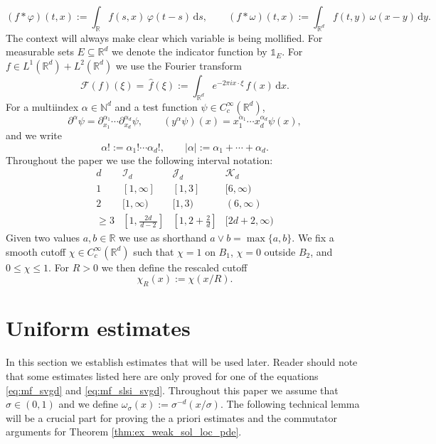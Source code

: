 \documentclass[reqno, 11pt]{amsart}
\numberwithin{equation}{section}
\theoremstyle{definition}
\begin{document}
\[
(f\ast\varphi)(t,x):=\int_{\mathbb{R}} f(s,x)\,\varphi(t-s)\,\mathrm{d} s,
\qquad
(f\ast\omega)(t,x):=\int_{\mathbb{R}^d} f(t,y)\,\omega(x-y)\,\mathrm{d} y.
\]
The context will always make clear which variable is being mollified.
For measurable sets $E\subseteq\mathbb{R}^d$ we denote the indicator function by $\mathds{1}_E$. For $f\in L^1(\mathbb{R}^d)+L^2(\mathbb{R}^d)$ we use the Fourier transform
\[
\mathcal{F}(f)(\xi)=\,\widehat f(\xi):=\int_{\mathbb{R}^d} e^{-2\pi i x\cdot\xi}\,f(x)\,\mathrm{d} x.
\]
For a multiindex $\alpha\in\mathbb{N}^d$ and a test function $\psi\in C_c^\infty(\mathbb{R}^d)$,
\[
\partial^\alpha\psi
=\partial_{x_1}^{\alpha_1}\cdots\partial_{x_d}^{\alpha_d}\psi,
\qquad
(y^\alpha\psi)(x)=x_1^{\alpha_1}\cdots x_d^{\alpha_d}\psi(x),
\]
and we write
\[
\alpha!:=\alpha_1!\cdots \alpha_d!,
\qquad
|\alpha|:=\alpha_1+\cdots+\alpha_d.
\]
Throughout the paper we use the following interval notation:
\[
\begin{array}{c|ccc}
    d & \mathcal{I}_d & \mathcal{J}_d & \mathcal{K}_d\\ \hline
    1 & [1,\infty] & [1,3] & [6,\infty)\\
    2 & [1,\infty) & [1,3) & (6,\infty)\\
    \ge 3 & [1,\tfrac{2d}{\,d-2\,}] & [1,2+\tfrac{2}{d}] & [2d+2,\infty)
\end{array}
\]
Given two values $a,b\in\mathbb{R}$ we use as shorthand $a\vee b=\max\{a,b\}$. We fix a smooth cutoff $\chi\in C_c^\infty(\mathbb{R}^d)$ such that $\chi=1$ on $B_1$, $\chi=0$ outside $B_2$, and $0\le \chi\le 1$.
For $R>0$ we then define the rescaled cutoff
\begin{equation}\label{eq:definition_cutoff_rescaled}
    \chi_R(x):=\chi(x/R).
\end{equation}


\section{Uniform estimates}
\label{sec:unif_est}
In this section we establish estimates that will be used later. Reader should note that some estimates listed here are only proved for one of the equations \eqref{eq:mf_svgd} and \eqref{eq:mf_slsi_svgd}.
Throughout this paper we assume that $\sigma\in (0,1)$ and we define  $\omega_\sigma(x):=\sigma^{-d}(x/\sigma)$. The following technical lemma will be a crucial part for proving the a priori estimates and the commutator arguments for Theorem \ref{thm:ex_weak_sol_loc_pde}.
\end{document}
